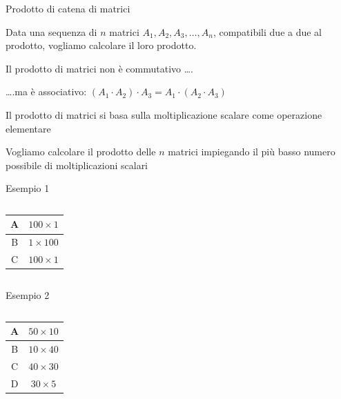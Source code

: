 \begin{frame}{Prodotto di catena di matrici}

\vspace{-9pt}
\begin{myboxtitle}[Problema]
Data una sequenza di $n$ matrici $A_1, A_2, A_3, \ldots, A_n$, compatibili due a due al prodotto, vogliamo calcolare il loro prodotto.
\BIL
\item  Il prodotto di matrici non è \alert{commutativo} \ldots .
\item  \ldots .ma è \alert{associativo}: $(A_1 \cdot A_2) \cdot A_3 = A_1 \cdot (A_2 \cdot A_3)$ 
\EIL
\end{myboxtitle}

\BIL
\item Il prodotto di matrici si basa sulla \alert{moltiplicazione scalare} come operazione elementare
\item Vogliamo calcolare il prodotto delle $n$ matrici impiegando il più basso numero possibile di moltiplicazioni scalari
\EIL

\end{frame}

\begin{frame}{Esempio 1}
    
\vspace{-9pt}
\begin{columns}[T]
\begingroup
\setlength\arrayrulewidth{1pt}
\begin{tabular}{|c|c|}
\hline
A & $100 \times 1$ \\\hline
B & $1 \times 100$ \\\hline
C & $100 \times 1$ \\\hline
\end{tabular}    
\endgroup
{}
\vspace{-16pt}    
\end{columns}

\end{frame}

\begin{frame}{Esempio 2}

\vspace{-9pt}
\begin{columns}[T]
\begingroup
\setlength\arrayrulewidth{1pt}
\begin{tabular}{|c|c|}
\hline
A & $50 \times 10$ \\\hline
B & $10 \times 40$ \\\hline
C & $40 \times 30$ \\\hline
D & $30 \times 5$ \\\hline
\end{tabular}    
\endgroup
{}
\vspace{-16pt}    
\end{columns}

\end{frame}


